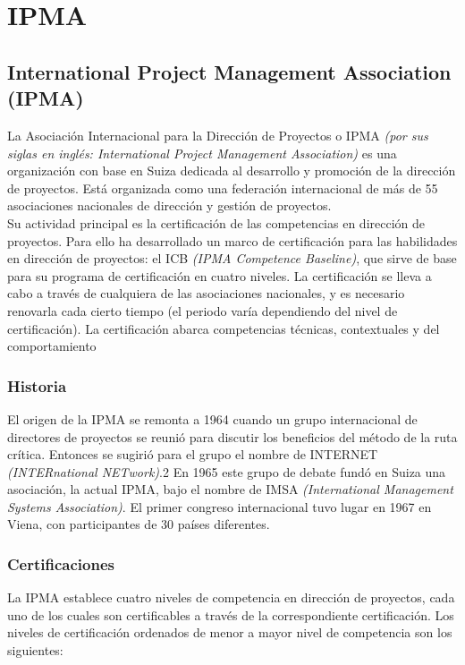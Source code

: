 \section{IPMA}

\subsection{International Project Management Association (IPMA)}

La Asociación Internacional para la Dirección de Proyectos o IPMA \emph{(por sus siglas en inglés: International Project Management Association)} es una organización con base en Suiza dedicada al desarrollo y promoción de la dirección de proyectos. Está organizada como una federación internacional de más de 55 asociaciones nacionales de dirección y gestión de proyectos.\\

Su actividad principal es la certificación de las competencias en dirección de proyectos. Para ello ha desarrollado un marco de certificación para las habilidades en dirección de proyectos: el ICB \emph{(IPMA Competence Baseline)}, que sirve de base para su programa de certificación en cuatro niveles. La certificación se lleva a cabo a través de cualquiera de las asociaciones nacionales, y es necesario renovarla cada cierto tiempo (el periodo varía dependiendo del nivel de certificación). La certificación abarca competencias técnicas, contextuales y del comportamiento

\subsubsection{Historia}

El origen de la IPMA se remonta a 1964 cuando un grupo internacional de directores de proyectos se reunió para discutir los beneficios del método de la ruta crítica. Entonces se sugirió para el grupo el nombre de INTERNET \emph{(INTERnational NETwork)}.2 En 1965 este grupo de debate fundó en Suiza una asociación, la actual IPMA, bajo el nombre de IMSA \emph{(International Management Systems Association)}. El primer congreso internacional tuvo lugar en 1967 en Viena, con participantes de 30 países diferentes.

\subsubsection{Certificaciones}

La IPMA establece cuatro niveles de competencia en dirección de proyectos, cada uno de los cuales son certificables a través de la correspondiente certificación. Los niveles de certificación ordenados de menor a mayor nivel de competencia son los siguientes:\\

